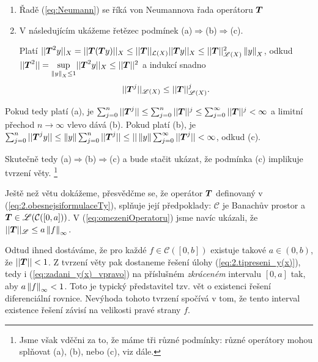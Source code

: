 \begin{remark} 
\begin{enumerate}
    \item Řadě (\ref{eq:Neumann}) se říká von Neumannova řada operátoru $ \boldsymbol{T} $
    \item V následujícím ukážeme řetězec podmínek (a)$\Rightarrow$(b)$\Rightarrow$(c).
    
    Platí $|| \boldsymbol{T} ^2y||_X = || \boldsymbol{T} ( \boldsymbol{T} y)||_X\leq|| \boldsymbol{T} ||_{\mathcal{L}(X)}|| \boldsymbol{T} y||_X\leq|| \boldsymbol{T} ||^2_{\mathscr{L}(X)}\left\lVert y\right\rVert_X$, odkud $|| \boldsymbol{T} ^2||=\underset{\left\lVert y\right\rVert_X\leq 1}{\sup}|| \boldsymbol{T} ^2y||_X\leq|| \boldsymbol{T} ||^2$ a indukcí snadno
    \begin{equation}
        || \boldsymbol{T} ^j||_{\mathscr{L}(X)}\leq || \boldsymbol{T} ||^j_{\mathscr{L}(X)}.
    \end{equation}
\end{enumerate}
\end{remark}

Pokud tedy platí (a), je $\sum_{j=0}^n|| \boldsymbol{T} ^j||\leq\sum_{j=0}^n|| \boldsymbol{T} ||^j\leq \sum_{j=0}^\infty|| \boldsymbol{T} ||^j<\infty$ a limitní přechod $n\rightarrow \infty$ vlevo dává (b). Pokud platí (b), je $\sum_{j=0}^n|| \boldsymbol{T} ^jy||\leq\left\lVert y\right\rVert\sum_{j=0}^n|| \boldsymbol{T} ^j||\leq||\left\lVert y\right\rVert\sum_{j=0}^\infty|| \boldsymbol{T} ^j||<\infty$, odkud (c).

Skutečně tedy (a)$\Rightarrow$(b)$\Rightarrow$(c) a bude stačit ukázat, že podmínka (c) implikuje tvrzení věty. \footnote{Jsme však vděčni za to, že máme tři různé podmínky: různé operátory mohou splňovat (a), (b), nebo (c), viz dále.}

Ještě než větu dokážeme, přesvědčme se, že operátor $ \boldsymbol{T} $ definovaný v (\ref{eq:2.obesnejsiformulaceTy}), splňuje její předpoklady: $\mathcal{C}$ je Banachův prostor a $ \boldsymbol{T} \in\mathscr{L}(\mathcal{C}([0,a]))$. V (\ref{eq:omezeniOperatoru}) jsme navíc ukázali, že $|| \boldsymbol{T} ||_{\mathscr{L}}\leq a\left\lVert f\right\rVert_\infty.$

Odtud ihned dostáváme, že pro každé $f\in\mathcal{C}([0,b])$ existuje takové
$a\in (0,b)$, že $|| \boldsymbol{T} ||<1$.
Z tvrzení věty pak dostaneme  řešení úlohy (\ref{eq:2.tipreseni_y(x)}), tedy i (\ref{eq:zadani_y(x)_vpravo}) na příslušném \emph{zkráceném} intervalu $[0,a]$
tak, aby $a\left\lVert f\right\rVert_\infty<1$. Toto je typický představitel tzv. vět o  existenci řešení diferenciální rovnice. Nevýhoda tohoto tvrzení spočívá v tom, že tento interval existence řešení závisí na velikosti pravé strany $f$.

